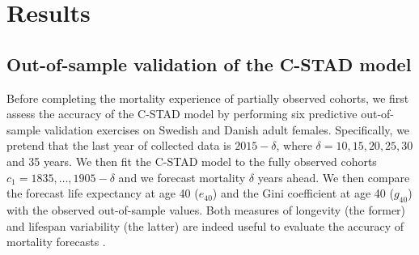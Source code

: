 \documentclass[11pt, a4paper]{article}
\begin{document}

\section{Results}
\label{Sec:Results}

\subsection{Out-of-sample validation of the C-STAD model}
\label{Subsec:Out-of-sample}
Before completing the mortality experience of partially observed cohorts, we first assess the accuracy of the C-STAD model by performing six predictive out-of-sample validation exercises on Swedish and Danish adult females. Specifically, we pretend that the last year of collected data is $2015 - \delta$, where $\delta=10,15,20,25,30$ and 35 years. We then fit the C-STAD model to the fully observed cohorts $c_1=1835,\ldots,1905-\delta$ and we forecast mortality $\delta$ years ahead. We then compare the forecast life expectancy at age 40 ($e_{40}$) and the Gini coefficient at age 40 ($g_{40}$) with the observed out-of-sample values. Both measures of longevity (the former) and lifespan variability (the latter) are indeed useful to evaluate the accuracy of mortality forecasts \citep{bohk2017lifespan}. \par
\end{document}
